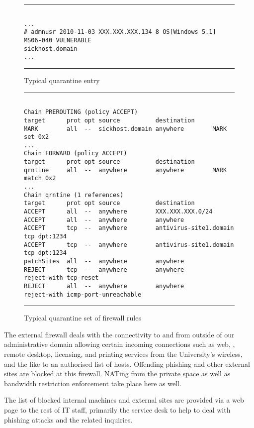 \begin{figure}[htpb!]
\hrule
\scriptsize
\begin{verbatim}

...
# admnusr 2010-11-03 XXX.XXX.XXX.134 8 OS[Windows 5.1] MS06-040 VULNERABLE
sickhost.domain
...
\end{verbatim}
\normalsize
\hrule
\caption{Typical quarantine entry}
\label{fig:typical-quarantine-entry}
\end{figure}

\begin{figure*}[htpb!]
\hrule
\scriptsize
\begin{verbatim}

Chain PREROUTING (policy ACCEPT)
target      prot opt source          destination
MARK        all  --  sickhost.domain anywhere        MARK set 0x2
...
Chain FORWARD (policy ACCEPT)
target      prot opt source          destination
qrntine     all  --  anywhere        anywhere        MARK match 0x2
...
Chain qrntine (1 references)
target      prot opt source          destination
ACCEPT      all  --  anywhere        XXX.XXX.XXX.0/24
ACCEPT      all  --  anywhere        anywhere
ACCEPT      tcp  --  anywhere        antivirus-site1.domain tcp dpt:1234
ACCEPT      tcp  --  anywhere        antivirus-site1.domain tcp dpt:1234
patchSites  all  --  anywhere        anywhere
REJECT      tcp  --  anywhere        anywhere        reject-with tcp-reset
REJECT      all  --  anywhere        anywhere        reject-with icmp-port-unreachable
\end{verbatim}
\normalsize
\hrule
\caption{Typical quarantine set of firewall rules}
\label{fig:typical-quarantine-firewall-rules}
\end{figure*}

The external firewall deals with the connectivity to and from outside of
our administrative domain allowing certain incoming connections such as web,
, remote desktop, licensing, and printing services from the University's wireless,
and the like to an authorised list of hosts. Offending phishing and
other external sites are blocked at this firewall. NATing from the private
space as well as bandwidth restriction enforcement take place here as well.

The list of blocked internal machines and external sites are provided
via a web page to the rest of IT staff, primarily the service desk
to help to deal with phishing attacks and the related inquiries.

